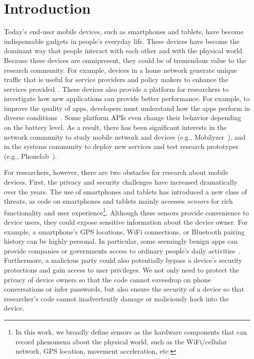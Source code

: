 \section{Introduction}

Today's end-user mobile devices, such as smartphones and
tablets, have become indispensable gadgets in people's everyday
life. These devices have become the dominant way that 
people interact with each other and with the physical world. Because 
these devices are omnipresent, they could be of tremendous value to 
the research community. For example, devices in a home network  
generate unique traffic that is useful for service providers and policy
makers to enhance the services provided~\cite{sundaresan2011broadband}.
These devices also provide a platform for researchers to
investigate how new applications can provide better performance.
For example, to improve the quality of apps, developers must 
understand how the apps perform in diverse 
conditions~\cite{ravindranath2012appinsight}. Some platform
APIs even change their behavior depending on the battery level.
As a result, there has been significant interests in the network
community to study mobile network and devices
(e.g., Mobilyzer~\cite{nikravesh2015mobilyzer}), and in the
systems community to deploy new services and test research
prototypes (e.g., Phonelab~\cite{phonelab, nandugudi2013phonelab}).  
					
For researchers, however, there are two obstacles for research
about mobile devices. First, the privacy and security challenges
have increased dramatically over the years. The use of 
smartphones and tablets has introduced a new class of threats, 
as code on smartphones and tablets mainly accesses
\textit{sensors} for rich functionality and user experience\footnote{\scriptsize In 
this work, we broadly define sensors as the hardware components 
that can record phenomena about the physical world, such as the 
WiFi/cellular network, GPS location, movement acceleration, etc.}. 
Although these sensors provide convenience to device users, they 
could expose sensitive information about the device 
owner. For example, a smartphone's GPS locations,
WiFi connections, or Bluetooth pairing history can be highly
personal. In particular, some seemingly benign apps can provide 
companies or governments access to ordinary 
people's daily activities~\cite{AngryBirds}. Furthermore, 
a malicious party could also potentially bypass a
device's security protections and gain access to user
privileges. We not only need to  protect the privacy
of device owners so that the code cannot eavesdrop on phone
conversations or infer passwords, but also ensure the security of a device
so that researcher's code cannot inadvertently damage or
maliciously hack into the device.


